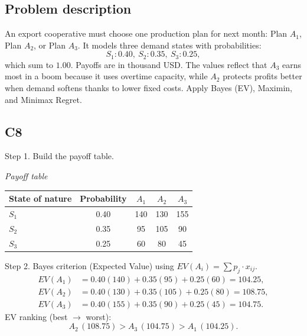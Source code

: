 


	
	\begin{ExamProblems}
		\item\leavevmode\par
		\subsection*{Problem description}
		An export cooperative must choose one production plan for next month: Plan $A_1$, Plan $A_2$, or Plan $A_3$.
		It models three demand states with probabilities:
		\[
		S_1:0.40,\ S_2:0.35,\ S_3:0.25,
		\]
		which sum to $1.00$.
		Payoffs are in thousand USD. The values reflect that $A_3$ earns most in a boom because it uses overtime capacity, while $A_2$ protects profits better when demand softens thanks to lower fixed costs. Apply Bayes (EV), Maximin, and Minimax Regret.

		\subsection*{C8}
		Step 1. Build the payoff table.
		\begin{center}
			\textit{Payoff table} \\
			\begin{tabular}{l c c c c}
				\toprule
				State of nature & Probability & $A_1$ & $A_2$ & $A_3$ \\
				\midrule
				$S_1$ & 0.40 & 140 & 130 & 155 \\
				$S_2$ & 0.35 & 95 & 105 & 90 \\
				$S_3$ & 0.25 & 60 & 80 & 45 \\
				\bottomrule
			\end{tabular}
		\end{center}

		Step 2. Bayes criterion (Expected Value) using $EV(A_i)=\sum p_j\cdot x_{ij}$.
		\[
		\begin{aligned}
		EV(A_1) &= 0.40(140)+0.35(95)+0.25(60)=104.25,\\
		EV(A_2) &= 0.40(130)+0.35(105)+0.25(80)=108.75,\\
		EV(A_3) &= 0.40(155)+0.35(90)+0.25(45)=104.75.
		\end{aligned}
		\]
		EV ranking (best $\to$ worst):
		\[
		A_2\,(108.75) > A_3\,(104.75) > A_1\,(104.25).
		\]


\end{ExamProblems}
